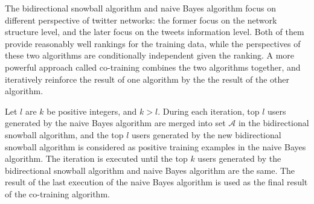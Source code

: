 \documentclass{article}
\begin{document}
The bidirectional snowball algorithm and naive Bayes algorithm focus on different perspective of twitter networks: the former focus on the network structure level, and the later focus on the tweets information level. Both of them provide reasonably well rankings for the training data, while the perspectives of these two algorithms are conditionally independent given the ranking. A more powerful approach called co-training \cite{cotraining} combines the two algorithms together, and iteratively reinforce the result of one algorithm by the the result of the other algorithm.


Let $l$ are $k$ be positive integers, and $k > l$. During each iteration, top $l$ users generated by the naive Bayes algorithm are merged into set $\mathcal{A}$ in the bidirectional snowball algorithm, and the top $l$ users generated by the new bidirectional snowball algorithm is considered as positive training examples in the naive Bayes algorithm. The iteration is executed until the top $k$ users generated by the bidirectional snowball algorithm and naive Bayes algorithm are the same. The result of the last execution of the naive Bayes algorithm is used as the final result of the co-training algorithm.


\ifx \allfiles \undefined
\end{document}
